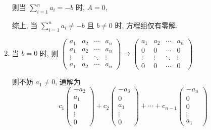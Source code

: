 \begin{enumerate}
                   则当 $\sum_{i=1}^{n} a_{i} = -b$ 时, $A=0$,

                   综上, 当 $\sum_{i=1}^{n} a_{i} \neq -b$ 且 $b \neq 0$ 时, 方程组仅有零解.
             \item %
                   当 $b=0$ 时, 则 $ \begin{pmatrix}
                           a_{1}  & a_{2}  & \cdots & a_{n}  \\
                           a_{1}  & a_{2}  & \cdots & a_{n}  \\
                           \vdots & \vdots & \ddots & \vdots \\
                           a_{1}  & a_{2}  & \cdots & a_{n}
                       \end{pmatrix} \rightarrow \begin{pmatrix}
                           a_{1}  & a_{2}  & \cdots & a_{n}  \\
                           0      & 0      & \cdots & 0      \\
                           \vdots & \vdots & \ddots & \vdots \\
                           0      & 0      & \cdots & 0
                       \end{pmatrix} $

                   则不妨 $a_{1} \neq 0$, 通解为
                   \[ c_{1}\begin{pmatrix}
                           -a_{2} \\
                           a_{1}  \\
                           0      \\
                           \vdots \\
                           0
                       \end{pmatrix} + c_{2}\begin{pmatrix}
                           -a_{3} \\
                           0      \\
                           a_{1}  \\
                           \vdots \\
                           0
                       \end{pmatrix} + \cdots + c_{n-1}\begin{pmatrix}
                           -a_{n} \\
                           0      \\
                           0      \\
                           \vdots \\
                           a_{1}
                       \end{pmatrix} \]


\end{enumerate}
